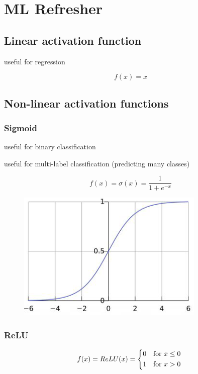 \documentclass[11pt]{article}
\begin{document}
\section{ML Refresher}

\subsection{Linear activation function}

useful for regression

\begin{equation}
    f(x)=x
\end{equation}

\subsection{Non-linear activation functions}

\subsubsection{Sigmoid}

useful for binary classification

useful for multi-label classification (predicting many classes)

\begin{equation}
    f(x)=\sigma(x)=\frac{1}{1 + e^{-x}}
\end{equation}

\begin{figure}[H]
    \centering
    \includegraphics*[width=.3\linewidth]{images/sigmoid.png}
\end{figure}

\subsubsection{ReLU}

\begin{equation}
    f(x)=ReLU(x)=\begin{dcases*}
        0 & for $x \leq 0$ \\ 1 & for $x > 0$
    \end{dcases*}
\end{equation}
\end{document}
